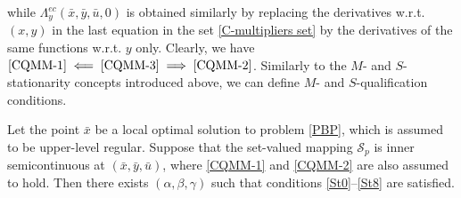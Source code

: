 while $\Lambda^{ec}_y(\bar{x},\bar{y},\bar{u},0)$ is obtained similarly by replacing the derivatives w.r.t. $(x, y)$ in the last equation in the set \eqref{C-multipliers set} by the derivatives of the same functions w.r.t. $y$ only. 
%
%
Clearly, we have $\eqref{CQMM-1} \impliedby \eqref{CQMM-3} \implies \eqref{CQMM-2}$. 
Similarly to the $M$- and $S$-stationarity concepts introduced above, we can define $M$- and $S$-qualification conditions.


\begin{theorem}[\cite{D2}]\label{Th21Sect2} Let the point $\bar{x}$ be a local optimal solution to problem 
	\eqref{PBP}, which is assumed to be upper-level regular. Suppose that the set-valued mapping $\mathcal{S}_p$ is inner
	semicontinuous at $(\bar{x},\bar{y},\bar{u})$, where \eqref{CQMM-1} and \eqref{CQMM-2} are also assumed to hold. Then there exists $\left(\alpha,\beta,\gamma\right)$  such that conditions \eqref{St0}--\eqref{St8} are satisfied.
\end{theorem}

